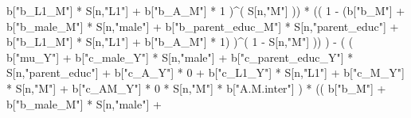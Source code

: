 \documentclass[
]{book}
\newenvironment{Shaded}{\begin{snugshade}}{\end{snugshade}}
\newcommand{\DecValTok}[1]{\textcolor[rgb]{0.00,0.00,0.81}{#1}}
\newcommand{\NormalTok}[1]{#1}
\newcommand{\SpecialCharTok}[1]{\textcolor[rgb]{0.00,0.00,0.00}{#1}}
\newcommand{\StringTok}[1]{\textcolor[rgb]{0.31,0.60,0.02}{#1}}
\begin{document}
\begin{Shaded}
\begin{Highlighting}[]
\NormalTok{                           b[}\StringTok{"b\_L1\_M"}\NormalTok{] }\SpecialCharTok{*}\NormalTok{ S[n,}\StringTok{"L1"}\NormalTok{] }\SpecialCharTok{+}
\NormalTok{                           b[}\StringTok{"b\_A\_M"}\NormalTok{] }\SpecialCharTok{*} \DecValTok{1}\NormalTok{ )}\SpecialCharTok{\^{}}\NormalTok{( S[n,}\StringTok{"M"}\NormalTok{] )) }\SpecialCharTok{*}
\NormalTok{                      (( }\DecValTok{1} \SpecialCharTok{{-}}\NormalTok{ (b[}\StringTok{"b\_M"}\NormalTok{] }\SpecialCharTok{+} 
\NormalTok{                                b[}\StringTok{"b\_male\_M"}\NormalTok{] }\SpecialCharTok{*}\NormalTok{ S[n,}\StringTok{"male"}\NormalTok{] }\SpecialCharTok{+} 
\NormalTok{                                b[}\StringTok{"b\_parent\_educ\_M"}\NormalTok{] }\SpecialCharTok{*}\NormalTok{ S[n,}\StringTok{"parent\_educ"}\NormalTok{] }\SpecialCharTok{+} 
\NormalTok{                                b[}\StringTok{"b\_L1\_M"}\NormalTok{] }\SpecialCharTok{*}\NormalTok{ S[n,}\StringTok{"L1"}\NormalTok{] }\SpecialCharTok{+}
\NormalTok{                                b[}\StringTok{"b\_A\_M"}\NormalTok{] }\SpecialCharTok{*} \DecValTok{1}\NormalTok{) )}\SpecialCharTok{\^{}}\NormalTok{( }\DecValTok{1} \SpecialCharTok{{-}}\NormalTok{ S[n,}\StringTok{"M"}\NormalTok{] )) ) }\SpecialCharTok{{-}} 
\NormalTok{                    ( ( b[}\StringTok{"mu\_Y"}\NormalTok{] }\SpecialCharTok{+} 
\NormalTok{                          b[}\StringTok{"c\_male\_Y"}\NormalTok{] }\SpecialCharTok{*}\NormalTok{ S[n,}\StringTok{"male"}\NormalTok{] }\SpecialCharTok{+} 
\NormalTok{                          b[}\StringTok{"c\_parent\_educ\_Y"}\NormalTok{] }\SpecialCharTok{*}\NormalTok{ S[n,}\StringTok{"parent\_educ"}\NormalTok{] }\SpecialCharTok{+}
\NormalTok{                          b[}\StringTok{"c\_A\_Y"}\NormalTok{] }\SpecialCharTok{*} \DecValTok{0} \SpecialCharTok{+}
\NormalTok{                          b[}\StringTok{"c\_L1\_Y"}\NormalTok{] }\SpecialCharTok{*}\NormalTok{ S[n,}\StringTok{"L1"}\NormalTok{] }\SpecialCharTok{+}
\NormalTok{                          b[}\StringTok{"c\_M\_Y"}\NormalTok{] }\SpecialCharTok{*}\NormalTok{ S[n,}\StringTok{"M"}\NormalTok{] }\SpecialCharTok{+} 
\NormalTok{                          b[}\StringTok{"c\_AM\_Y"}\NormalTok{] }\SpecialCharTok{*} \DecValTok{0} \SpecialCharTok{*}\NormalTok{ S[n,}\StringTok{"M"}\NormalTok{] }\SpecialCharTok{*}\NormalTok{ b[}\StringTok{"A.M.inter"}\NormalTok{] ) }\SpecialCharTok{*}
\NormalTok{                        (( b[}\StringTok{"b\_M"}\NormalTok{] }\SpecialCharTok{+} 
\NormalTok{                             b[}\StringTok{"b\_male\_M"}\NormalTok{] }\SpecialCharTok{*}\NormalTok{ S[n,}\StringTok{"male"}\NormalTok{] }\SpecialCharTok{+} 

\end{Highlighting}
\end{Shaded}
\end{document}
